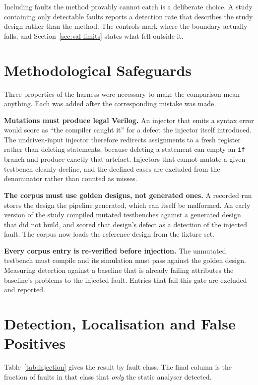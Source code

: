 \documentclass[11pt,a4paper,titlepage=false]{scrreprt}
\begin{document}
Including faults the method provably cannot catch is a deliberate choice. A study
containing only detectable faults reports a detection rate that describes the study design
rather than the method. The controls mark where the boundary actually falls, and
Section~\ref{sec:val-limits} states what fell outside it.

\section{Methodological Safeguards}\label{sec:val-safeguards}

Three properties of the harness were necessary to make the comparison mean anything. Each
was added after the corresponding mistake was made.

\textbf{Mutations must produce legal Verilog.} An injector that emits a syntax error would
score as ``the compiler caught it'' for a defect the injector itself introduced. The
undriven-input injector therefore redirects assignments to a fresh register rather than
deleting statements, because deleting a statement can empty an \texttt{if} branch and
produce exactly that artefact. Injectors that cannot mutate a given testbench cleanly
decline, and the declined cases are excluded from the denominator rather than counted as
misses.

\textbf{The corpus must use golden designs, not generated ones.} A recorded run stores the
design the pipeline generated, which can itself be malformed. An early version of the study
compiled mutated testbenches against a generated design that did not build, and scored that
design's defect as a detection of the injected fault. The corpus now loads the reference
design from the fixture set.

\textbf{Every corpus entry is re-verified before injection.} The unmutated testbench must
compile and its simulation must pass against the golden design. Measuring detection against
a baseline that is already failing attributes the baseline's problems to the injected
fault. Entries that fail this gate are excluded and reported.

\section{Detection, Localisation and False Positives}\label{sec:val-results}

Table~\ref{tab:injection} gives the result by fault class. The final column is the fraction
of faults in that class that \emph{only} the static analyser detected.
\end{document}
